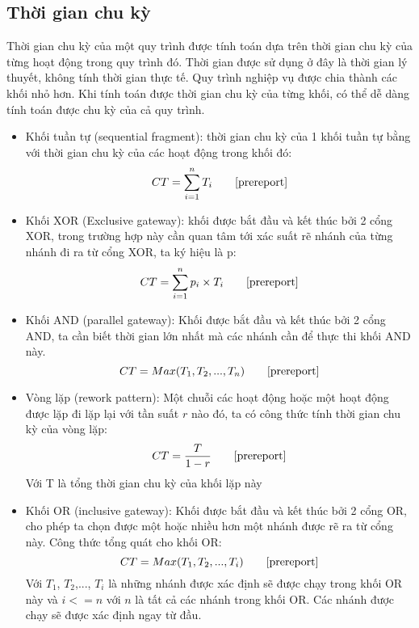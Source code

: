 \subsection{Thời gian chu kỳ}
Thời gian chu kỳ của một quy trình được tính toán dựa trên thời gian chu kỳ của từng hoạt động trong quy trình đó. Thời gian được sử dụng ở đây là thời gian lý thuyết, không tính thời gian thực tế.
Quy trình nghiệp vụ được chia thành các khối nhỏ hơn. Khi tính toán được thời gian chu kỳ của từng khối, có thể dễ dàng tính toán được chu kỳ của cả quy trình.
\begin{itemize}
    \item Khối tuần tự (sequential fragment): thời gian chu kỳ của 1 khối tuần tự bằng với thời gian chu kỳ của các hoạt động trong khối đó:
 \[ CT =\sum_{i=1}^{n} T_i \tag*{\cite{prereport}}\]
   \item Khối XOR (Exclusive gateway): khối được bắt đầu và kết thúc bởi 2 cổng XOR, trong trường hợp này cần quan tâm tới xác suất rẽ nhánh của từng nhánh đi ra từ cổng XOR, ta ký hiệu là p:
   \[ CT =\sum_{i=1}^{n} p_i \times T_i \tag*{\cite{prereport}}\]
   \item Khối AND (parallel gateway): Khối được bắt đầu và kết thúc bởi 2 cổng AND, ta cần biết thời gian lớn nhất mà các nhánh cần để thực thi khối AND này.
   \[ CT = Max(T_1, T_2,..., T_n) \tag*{\cite{prereport}}\]
   \item Vòng lặp (rework pattern): Một chuỗi các hoạt động hoặc một hoạt động được lặp đi lặp lại với tần suất $r$ nào đó, ta có công thức tính thời gian chu kỳ của vòng lặp:
   \[ CT = \frac{T}{1 - r} \tag*{\cite{prereport}}\]
   Với T là tổng thời gian chu kỳ của khối lặp này
   \item Khối OR (inclusive gateway): Khối được bắt đầu và kết thúc bởi 2 cổng OR, cho phép ta chọn được một hoặc nhiều hơn một nhánh được rẽ ra từ cổng này. Công thức tổng quát cho khối OR:
   \[ CT = Max(T_1, T_2,..., T_i) \tag*{\cite{prereport}}\]
   Với $T_1$, $T_2$,..., $T_i$ là những nhánh được xác định sẽ được chạy trong khối OR này và $i <= n$ với $n$ là tất cả các nhánh trong khối OR. Các nhánh được chạy sẽ được xác định ngay từ đầu.
\end{itemize}